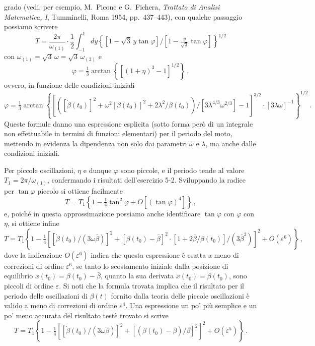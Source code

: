 \documentclass[11pt, a4paper]{book}
\numberwithin{equation}{section}
\begin{document}
grado (vedi, per esempio, M.~Picone e G.~Fichera, \textit{Trattato di Analisi
Matematica, I}, Tumminelli, Roma 1954, pp.~437--443), con qualche passaggio
possiamo scrivere
\[
    T = \frac{2\pi}{\omega_{(1)}} \cdot \frac{1}{2}
    \int_{-1}^{1} dy \left\{
    [1 - \sqrt{3}\,y\tan\varphi] / [1 - \tfrac{y}{\sqrt{3}}\tan\varphi]
    \right\}^{1/2}
\]
con $\omega_{(1)} = \sqrt{3}\,\omega = \sqrt{3}\,\omega_{(2)}$ e
\[
    \varphi = \tfrac{1}{3}\arctan\left\{[(1+\eta)^3 - 1]^{1/2}\right\} \,,
\]
ovvero, in funzione delle condizioni iniziali
\[
    \varphi = \tfrac{1}{3}\arctan\left\{
    \left[
    \left([\dot{\beta}(t_0)]^2 + \omega^2[\beta(t_0)]^2
    + 2\lambda^2/\beta(t_0)\right)/[3\lambda^{4/3}\omega^{2/3}] - 1
    \right]^{3/2}
    \cdot \left[3\lambda\omega\right]^{-1}
    \right\}^{1/2} \,.
\]
Queste formule danno una espressione esplicita (sotto forma però di un integrale
non effettuabile in termini di funzioni elementari) per il periodo del moto,
mettendo in evidenza la dipendenza non solo dai parametri $\omega$ e $\lambda$, ma
anche dalle condizioni iniziali.

Per piccole oscillazioni, $\eta$ e dunque $\varphi$ sono piccole, e il periodo
tende al valore $T_1 = 2\pi/\omega_{(1)}$, confermando i risultati dell'esercizio
5-2. Sviluppando la radice per $\tan\varphi$ piccolo si ottiene facilmente
\[
    T = T_1\left\{1 - \tfrac{1}{4}\tan^2\varphi + O[(\tan\varphi)^4]\right\} \,,
\]
e, poiché in questa approssimazione possiamo anche identificare $\tan\varphi$ con
$\varphi$ con $\eta$, si ottiene infine
\[
    T = T_1\left\{
    1 - \tfrac{1}{4}\left[
    [\dot{\beta}(t_0)/(3\omega\bar{\beta})]^2
    + [\beta(t_0)-\bar{\beta}]^2 \cdot [1+2\bar{\beta}/\beta(t_0)]/(3\bar{\beta}^2)
    \right]^2 + O(\varepsilon^6)
    \right\} \,,
\]
dove la indicazione $O(\varepsilon^6)$ indica che questa espressione è esatta a meno
di correzioni di ordine $\varepsilon^6$, se tanto lo scostamento iniziale dalla
posizione di equilibrio $x(t_0)=\beta(t_0)-\bar{\beta}$, quanto la sua derivata
$\dot{x}(t_0)=\dot{\beta}(t_0)$, sono piccoli di ordine $\varepsilon$. Si noti che la
formula trovata implica che il risultato per il periodo delle oscillazioni di
$\beta(t)$ fornito dalla teoria delle piccole oscillazioni è valido a meno di
correzioni di ordine $\varepsilon^4$. Una espressione un po' più semplice e un po'
meno accurata del risultato testè trovato si scrive
\[
    T = T_1\left\{
    1 - \tfrac{1}{4}\left[
    [\dot{\beta}(t_0)/(3\omega\bar{\beta})]^2
    + [(\beta(t_0)-\bar{\beta})/\bar{\beta}]^2
    \right]^2 + O(\varepsilon^5)
    \right\} \,.
\]
\end{document}
